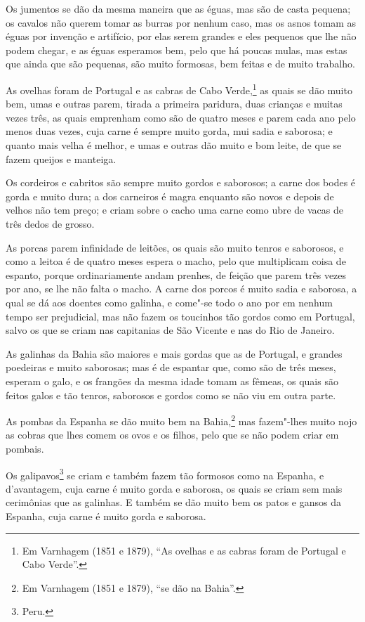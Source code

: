 Os jumentos se dão da mesma maneira que as éguas, mas são de casta pequena; os cavalos não
querem tomar as burras por nenhum caso, mas os asnos tomam as éguas por invenção e
artifício, por elas serem grandes e eles pequenos que lhe não podem chegar, e as éguas
esperamos bem, pelo que há poucas mulas, mas estas que ainda
que são pequenas, são muito formosas, bem feitas e de muito trabalho.

As ovelhas foram de Portugal e as cabras de Cabo Verde,\footnote{ Em Varnhagem (1851 e
1879), ``As ovelhas e as cabras foram de Portugal e Cabo Verde''.} as quais se dão muito
bem, umas e outras parem, tirada a primeira paridura, duas crianças e muitas vezes três,
as quais emprenham como são de quatro meses e parem cada ano pelo menos duas vezes, cuja
carne é sempre muito gorda, mui sadia e saborosa; e quanto mais velha é melhor, e umas e
outras dão muito e bom leite, de que se fazem queijos e manteiga.

Os cordeiros e cabritos são sempre muito gordos e saborosos; a carne dos bodes é gorda e
muito dura; a dos carneiros é magra enquanto são novos e depois de velhos não tem preço; e
criam sobre o cacho uma carne como ubre de vacas de três dedos de grosso.

As porcas parem infinidade de leitões, os quais são muito tenros e saborosos, e como a
leitoa é de quatro meses espera o macho, pelo que multiplicam coisa de espanto, porque
ordinariamente andam prenhes, de feição que parem três vezes por ano, se lhe não falta o
macho. A carne dos porcos é muito sadia e saborosa, a qual se dá aos doentes como galinha,
e come"-se todo o ano por em nenhum tempo ser prejudicial, mas não fazem os toucinhos tão
gordos como em Portugal, salvo os que se criam nas capitanias de São Vicente e nas do Rio
de Janeiro.

As galinhas da Bahia são maiores e mais gordas que as de Portugal, e grandes poedeiras e
muito saborosas; mas é de espantar que, como são de três meses, esperam o galo, e os
frangões da mesma idade tomam as fêmeas, os quais são feitos galos e tão tenros, saborosos
e gordos como se não viu em outra parte.

As pombas da Espanha se dão muito bem na Bahia,\footnote{ Em Varnhagem (1851 e 1879), ``se
dão na Bahia''.} mas fazem"-lhes muito nojo as cobras que lhes comem os ovos e os filhos,
pelo que se não podem criar em pombais.

Os galipavos\footnote{ Peru.} se criam e também fazem tão formosos como na Espanha, e
d'avantagem, cuja carne é muito gorda e saborosa, os quais se criam sem mais cerimônias que
as galinhas. E também se dão muito bem os patos e gansos da Espanha, cuja carne é muito
gorda e saborosa.

